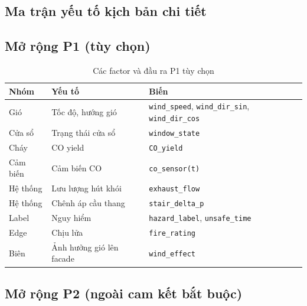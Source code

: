 
\begin{appendices}

\chapter{Ma trận yếu tố kịch bản chi tiết}
\label{app:factormatrix}

\section{Mở rộng P1 (tùy chọn)}

\begin{table}[H]
\centering
\caption{Các factor và đầu ra P1 tùy chọn}
\label{tab:factorP1}
\begin{tabularx}{\textwidth}{l l X}
\toprule
\textbf{Nhóm} & \textbf{Yếu tố} & \textbf{Biến} \\
\midrule
Gió     & Tốc độ, hướng gió        & \texttt{wind\_speed}, \texttt{wind\_dir\_sin}, \texttt{wind\_dir\_cos} \\
Cửa sổ  & Trạng thái cửa sổ       & \texttt{window\_state} \\
Cháy    & CO yield                  & \texttt{CO\_yield} \\
Cảm biến & Cảm biến CO              & \texttt{co\_sensor(t)} \\
Hệ thống & Lưu lượng hút khói      & \texttt{exhaust\_flow} \\
Hệ thống & Chênh áp cầu thang      & \texttt{stair\_delta\_p} \\
Label    & Nguy hiểm                & \texttt{hazard\_label}, \texttt{unsafe\_time} \\
Edge     & Chịu lửa                 & \texttt{fire\_rating} \\
Biên     & Ảnh hưởng gió lên facade & \texttt{wind\_effect} \\
\bottomrule
\end{tabularx}
\end{table}

\section{Mở rộng P2 (ngoài cam kết bắt buộc)}


\end{appendices}
